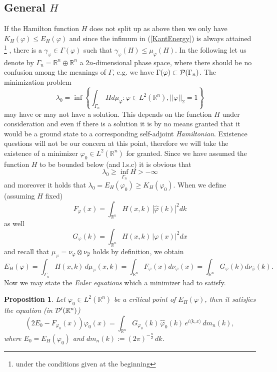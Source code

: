 \documentclass[12pt,a4paper,draft]{article}
\newcommand{\RR}[1]{\mathbb{R}^#1}
\newtheorem{prop}{Proposition}
\begin{document}
\subsection{General $H$}
If the Hamilton function $H$ does not split up as above then we only have
$K_H(\varphi)\leq E_H(\varphi)$ and since the infimum in (\ref{KantEnergy})
is always attained \footnote{under the conditions given at the beginning} , there is a $\gamma_{\varphi}\in\Gamma(\varphi)$ such that
$\gamma_{\varphi}(H) \leq \mu_{\varphi}(H)$. In the following let us denote
by $\Gamma_n = {\RR n}\oplus {\RR n}$ a $2n$-dimensional phase space, where
there should be no confusion among the meanings of $\Gamma$, e.g. we have $\Gamma(\varphi)\subset{\cal P}(\Gamma_n)$.
The minimization problem
\begin{equation}
                 \lambda_0 = \inf \left\{ \int_{\Gamma_n} H d\mu_\varphi: 
                       \varphi\in L^2(\RR n), ||\varphi||_2 = 1  \right\}
\end{equation}
may have or may not have a solution. This depends on the function $H$ under
consideration and even if there is a solution it is by no means granted that
it would be a ground state to a corresponding self-adjoint {\sl Hamiltonian}.
Existence questions will not be our concern at this point, therefore we will
take the existence of a minimizer $\varphi_0\in L^2(\RR n)$ for granted. Since
we have assumed the function $H$ to be bounded below (and l.s.c) it is obvious
that 
\begin{displaymath}
                  \lambda_0 \geq \inf_{\Gamma_n} H > - \infty
\end{displaymath} 
and moreover it holds that $\lambda_0=E_H(\varphi_0)\geq K_H(\varphi_0)$. When we define (assuming $H$ fixed) 
\begin{displaymath}
        F_{\varphi}(x) = \int_{\RR n} H(x,k)\, |\hat\varphi(k)|^2 dk
\end{displaymath} 
as well
\begin{displaymath}
        G_{\varphi}(k) = \int_{\RR n} H(x,k)\, |\varphi(x)|^2 dx
\end{displaymath}
and  recall that $\mu_{\varphi}=\nu_{\varphi}\otimes\nu_{\hat\varphi}$ holds by
definition, we obtain 
\begin{displaymath}
        E_H(\varphi)=\int_{\Gamma_n} H(x,k)\, d\mu_{\varphi}(x,k) =
           \int_{\RR n} F_{\varphi}(x) d\nu_{\varphi}(x) =
           \int_{\RR n} G_{\varphi}(k) d\nu_{\hat\varphi}(k). 
\end{displaymath} 
Now we may state the {\sl Euler equations} which a minimizer had to satisfy.
\begin{prop}
Let $\varphi_0\in L^2(\RR n)$ be a critical point of $E_H(\varphi)$, then
it satisfies the equation (in ${\cal D}'(\RR n)$)
\begin{equation}\label{EulerEq}
     \left(2 E_0 - F_{\varphi_0}(x)\right) \varphi_0(x) = 
         \int_{\RR n} G_{\varphi_0}(k)\, \hat\varphi_0(k)\, 
            e^{i\langle k,x \rangle}\, dm_n(k),
\end{equation} 
where $E_0 = E_H(\varphi_0)$ and $dm_n(k):=(2\pi)^{-\frac{n}{2}}\,dk$.
\end{prop}
\end{document}
